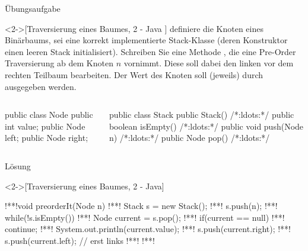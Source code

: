 \begin{frame}[fragile,c]{Übungsaufgabe}
    \begin{exercise}<2->[Traversierung eines Baumes, 2 - Java ]
         definiere die Knoten eines Binärbaums,  sei eine korrekt implementierte Stack-Klasse (deren Konstruktor einen leeren Stack initialisiert).\pause{} Schreiben Sie eine  Methode , die eine Pre-Order Traversierung ab dem Knoten \(n\) vornimmt. Diese soll dabei den linken vor dem rechten Teilbaum bearbeiten.\pause{} Der Wert des Knoten soll (jeweils) durch  ausgegeben werden.\pause{}
\begin{columns}[c]
%
\begin{column}{.42\linewidth}
\begin{plainjava}
public class Node {
    public int value;
    public Node left;
    public Node right;
}
\end{plainjava}
\end{column}
\begin{column}{.48\linewidth}
    \begin{plainjava}[morekeywords={[3]{Stack}}]
public class Stack {
    public Stack() {/*:ldots:*/}
    public boolean isEmpty() {/*:ldots:*/}
    public void push(Node n) {/*:ldots:*/}
    public Node pop() {/*:ldots:*/}
}
\end{plainjava}
\end{column}
\end{columns}
    \end{exercise}
\end{frame}

\begin{frame}[fragile,c]{Lösung}
    \begin{solve}<2->[Traversierung eines Baumes, 2 - Java]
\begin{plainjava}[morekeywords={[3]{Stack}}]
!**!void preorderIt(Node n) {
!**!    Stack s = new Stack();
!**!    s.push(n);
!**!    while(!s.isEmpty()) {
!**!        Node current = s.pop();
!**!        if(current == null)
!**!            continue;
!**!        System.out.println(current.value);
!**!        s.push(current.right);
!**!        s.push(current.left); // erst links
!**!    }
!**!}
\end{plainjava}
    \end{solve}
\end{frame}

